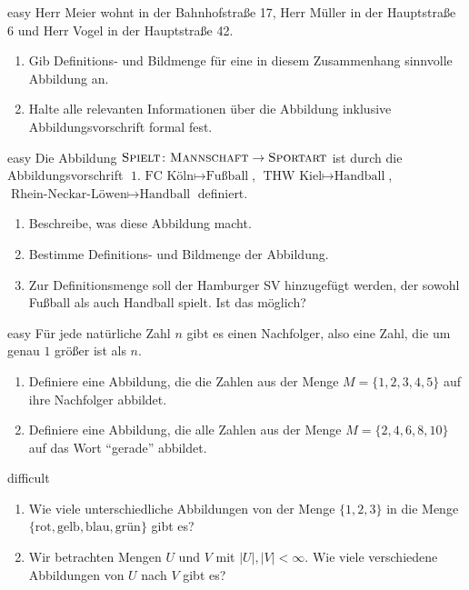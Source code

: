 \documentclass[../abbildungen.tex]{subfiles}
\begin{document}
\begin{exercise}{easy}
    Herr Meier wohnt in der Bahnhofstraße 17, Herr Müller in der Hauptstraße 6 und Herr Vogel in der Hauptstraße 42.
    \begin{enumerate}
        \item Gib Definitions- und Bildmenge für eine in diesem Zusammenhang sinnvolle Abbildung an.
        \item Halte alle relevanten Informationen über die Abbildung inklusive Abbildungsvorschrift formal fest.
    \end{enumerate}
\end{exercise}

\begin{exercise}{easy}
    Die Abbildung $\textsc{Spielt}\colon\textsc{Mannschaft}\rightarrow\textsc{Sportart}$ ist durch die Abbildungsvorschrift $\text{1. FC Köln}\mapsto\text{Fußball}$, $\text{THW Kiel}\mapsto\text{Handball}$, $\text{Rhein-Neckar-Löwen}\mapsto\text{Handball}$ definiert.
    \begin{enumerate}
        \item Beschreibe, was diese Abbildung macht.
        \item Bestimme Definitions- und Bildmenge der Abbildung.
        \item Zur Definitionsmenge soll der Hamburger SV hinzugefügt werden, der sowohl Fußball als auch Handball spielt. Ist das möglich?
    \end{enumerate}
\end{exercise}

\begin{exercise}{easy}
    Für jede natürliche Zahl $n$ gibt es einen Nachfolger, also eine Zahl, die um genau $1$ größer ist als $n$. 
    \begin{enumerate}
        \item Definiere eine Abbildung, die die Zahlen aus der Menge $M=\{1,2,3,4,5\}$ auf ihre Nachfolger abbildet.
        \item Definiere eine Abbildung, die alle Zahlen aus der Menge $M=\{2,4,6,8,10\}$ auf das Wort \enquote{gerade} abbildet.
    \end{enumerate}
\end{exercise}

\begin{exercise}{difficult}
    \begin{enumerate}
        \item Wie viele unterschiedliche Abbildungen von der Menge $\{1,2,3\}$ in die Menge $\{\text{rot},\text{gelb},\text{blau},\text{grün}\}$ gibt es?
        \item Wir betrachten Mengen $U$ und $V$ mit $|U|,|V|<\infty$. Wie viele verschiedene Abbildungen von $U$ nach $V$ gibt es?
    \end{enumerate}
\end{exercise}
\end{document}
